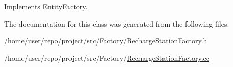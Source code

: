 Implements \hyperlink{classEntityFactory_a7f579ca02f15935e6901e5c955c9726a}{Entity\+Factory}.



The documentation for this class was generated from the following files\+:\begin{DoxyCompactItemize}
\item 
/home/user/repo/project/src/\+Factory/\hyperlink{RechargeStationFactory_8h}{Recharge\+Station\+Factory.\+h}\item 
/home/user/repo/project/src/\+Factory/\hyperlink{RechargeStationFactory_8cc}{Recharge\+Station\+Factory.\+cc}\end{DoxyCompactItemize}
